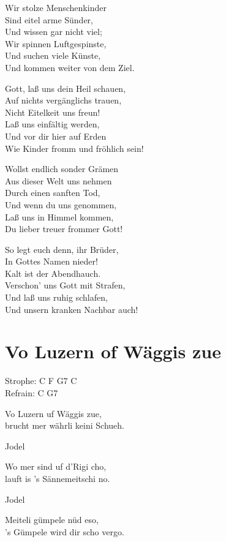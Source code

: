 \documentclass[
  letterpaper,
]{scrbook}
\begin{document}
Wir stolze Menschenkinder\\
Sind eitel arme Sünder,\\
Und wissen gar nicht viel;\\
Wir spinnen Luftgespinste,\\
Und suchen viele Künste,\\
Und kommen weiter von dem Ziel.

Gott, laß uns dein Heil schauen,\\
Auf nichts vergänglichs trauen,\\
Nicht Eitelkeit uns freun!\\
Laß uns einfältig werden,\\
Und vor dir hier auf Erden\\
Wie Kinder fromm und fröhlich sein!

Wollst endlich sonder Grämen\\
Aus dieser Welt uns nehmen\\
Durch einen sanften Tod,\\
Und wenn du uns genommen,\\
Laß uns in Himmel kommen,\\
Du lieber treuer frommer Gott!

So legt euch denn, ihr Brüder,\\
In Gottes Namen nieder!\\
Kalt ist der Abendhauch.\\
Verschon' uns Gott mit Strafen,\\
Und laß uns ruhig schlafen,\\
Und unsern kranken Nachbar auch!

\hypertarget{vo-luzern-of-wuxe4ggis-zue}{%
\chapter{Vo Luzern of Wäggis zue}\label{vo-luzern-of-wuxe4ggis-zue}}

Strophe: C F G7 C\\
Refrain: C G7

Vo Luzern uf Wäggis zue,\\
brucht mer währli keini Schueh.

Jodel

Wo mer sind uf d'Rigi cho,\\
lauft is 's Sännemeitschi no.

Jodel

Meiteli gümpele nüd eso,\\
's Gümpele wird dir scho vergo.
\end{document}
